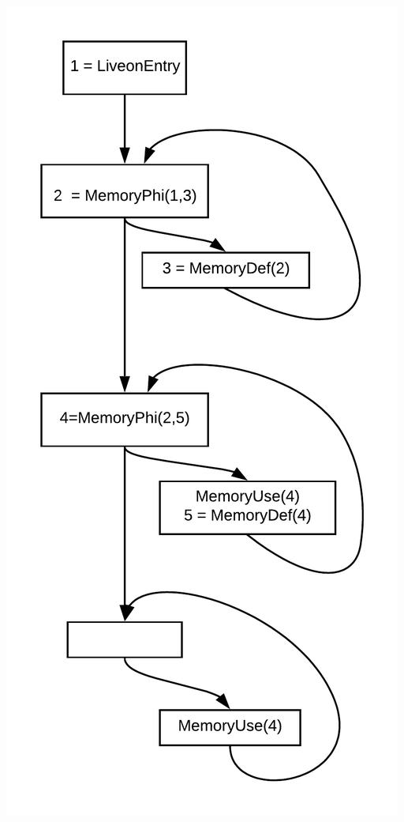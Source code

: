 \begin{minipage}{.5\textwidth}
\includegraphics[scale=0.6]{images/memorySSa-impl.png}
\label{memorySSa-impl}
\end{minipage}


